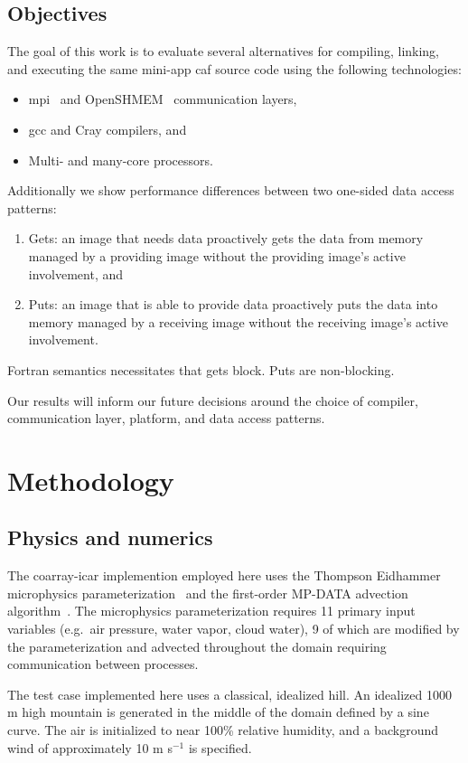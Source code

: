 \subsection{Objectives}
The goal of this work is to evaluate several alternatives for compiling, linking, and executing the
same \gls{mini-app} \gls{caf} source code using the following technologies:
\begin{itemize}
  \item \gls{mpi}~\cite{mpiforum2016mpi} and OpenSHMEM~\cite{openshmem2016} communication layers,
  \item \gls{gcc} and Cray compilers, and
  \item Multi- and many-core processors.
\end{itemize}
Additionally we show performance differences between two one-sided data access patterns:
\begin{enumerate}
  \item Gets: an image that needs data proactively gets the data from memory managed by a providing
        image without the providing image's active involvement, and
  \item Puts: an image that is able to provide data proactively puts the data into memory managed by
        a receiving image without the receiving image's active involvement.
\end{enumerate}
Fortran semantics necessitates that gets block.  Puts are non-blocking.

Our results will inform our future decisions around the choice of compiler, communication
layer, platform, and data access patterns.

\section{Methodology}
\subsection{Physics and numerics}
The coarray-\gls{icar} implemention employed here uses the Thompson Eidhammer microphysics parameterization~\cite{Thompson:2014cw} and the first-order MP-DATA advection algorithm~\cite{Smolarkiewicz:1998il}.
The microphysics parameterization requires 11 primary input variables (e.g.\ air pressure, water vapor, cloud water), 9 of which are modified by the parameterization and advected throughout the domain requiring communication between processes.

The test case implemented here uses a classical, idealized hill.
An idealized 1000 m high mountain is generated in the middle of the domain defined by a sine curve.
The air is initialized to near 100\% relative humidity, and a background wind of approximately 10 m s$^{-1}$ is specified.

